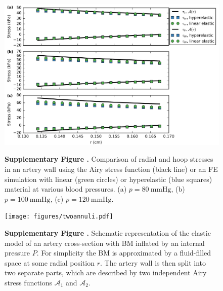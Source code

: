 \documentclass{frontiers_suppmat} %
\newcommand{\Airy}{\mathcal{A}}
\begin{document}
\begin{figure}
\begin{center}
\includegraphics[width=15cm]{figures/linear_hyperelastic.png}%
\end{center}
\textbf{\label{fig:linear_hyperelastic} Supplementary Figure .}{ Comparison of radial and hoop stresses in an artery wall using the Airy stress function (black line) or an FE simulation with linear (green circles) or hyperelastic (blue squares) material at various blood pressures. (a) $p = \SI{80}{\mmHg}$, (b) $p = \SI{100}{\mmHg}$, (c) $p = \SI{120}{\mmHg}$. }
\end{figure}

\begin{figure}
\begin{center}
\texttt{[image: figures/twoannuli.pdf]}%
\end{center}
\textbf{\label{fig:twoannuli} Supplementary Figure .}{ Schematic representation of the elastic model of an artery cross-section with BM inflated by an internal pressure $P$. For simplicity the BM is approximated by a fluid-filled space at some radial position $r$. The artery wall is then split into two separate parts, which are described by two independent Airy stress functions $\Airy_1$ and $\Airy_2$. }
\end{figure}
\end{document}
